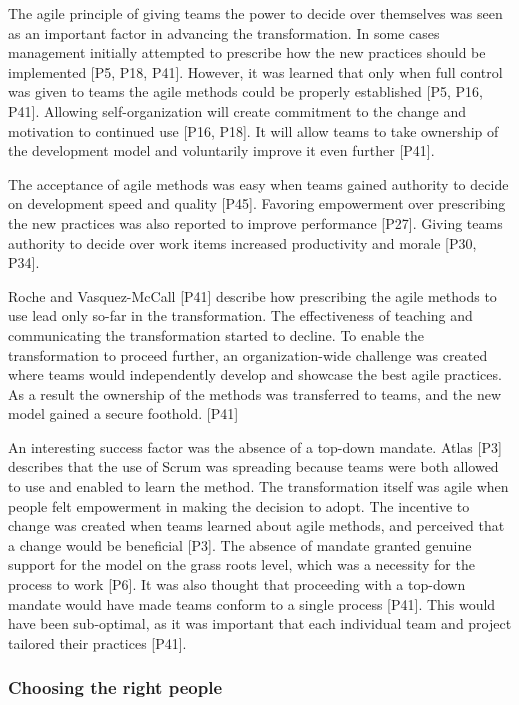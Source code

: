 \documentclass[preprint,authoryear,12pt]{elsarticle}
\begin{document}

The agile principle of giving teams the power to decide over themselves was seen
as an important factor in advancing the transformation.
In some cases management initially attempted to prescribe how the new practices
should be implemented [P5, P18, P41]. However, it was learned that only when
full control was given to teams the agile methods could be properly established
[P5, P16, P41].
Allowing self-organization will create commitment to the change and motivation
to continued use [P16, P18]. It will allow teams to take ownership of the
development model and voluntarily improve it even further [P41].

The acceptance of agile methods was easy when teams gained authority to decide
on development speed and quality [P45]. Favoring empowerment over prescribing
the new practices was also reported to improve performance [P27]. Giving teams
authority to decide over work items increased productivity and morale [P30,
P34].

Roche and Vasquez-McCall [P41] describe how prescribing the agile methods to use
lead only so-far in the transformation. The effectiveness of teaching and
communicating the transformation started to decline. To enable the
transformation to proceed further, an organization-wide challenge was created
where teams would independently develop and showcase the best agile practices.
As a result the ownership of the methods was transferred to teams, and the new
model gained a secure foothold. [P41]


An interesting success factor was the absence of a top-down mandate. Atlas [P3]
describes that the use of Scrum was spreading because teams were both allowed to
use and enabled to learn the method. The transformation itself was agile when
people felt empowerment in making the decision to adopt. The incentive to change
was created when teams learned about agile methods, and perceived that a change
would be beneficial [P3].
The absence of mandate granted genuine support for the model on the grass roots
level, which was a necessity for the process to work [P6].
It was also thought that proceeding with a top-down mandate would have made
teams conform to a single process [P41]. This would have been sub-optimal, as it
was important that each individual team and project tailored their practices
[P41].


\subsubsection{Choosing the right people}
\end{document}

